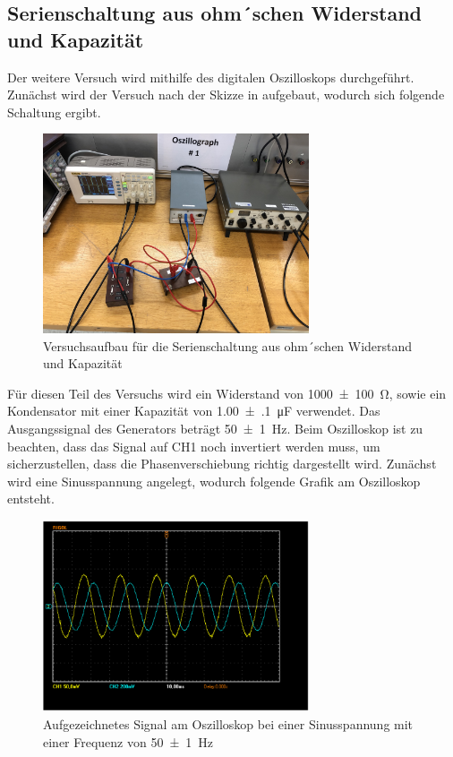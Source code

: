 \documentclass[11pt,ngerman]{scrartcl}
\begin{document}
\newpage

\subsection{Serienschaltung aus ohm´schen Widerstand und Kapazität}

Der weitere Versuch wird mithilfe des digitalen Oszilloskops durchgeführt. Zunächst wird der Versuch nach der Skizze in 	\label{fig:abb5} aufgebaut, wodurch sich folgende Schaltung ergibt.

\begin{figure}[H]
	\begin{center}
		\includegraphics[width=0.7\textwidth]{aufbau_c}
	\end{center}
	\caption{Versuchsaufbau für die Serienschaltung aus ohm´schen Widerstand und Kapazität}
	\label{fig:aufbau_c}
\end{figure}

Für diesen Teil des Versuchs wird ein Widerstand von \SI{1000(100)}{\ohm}, sowie ein Kondensator mit einer Kapazität von \SI{1.00(10)}{\micro\farad}	 verwendet. Das Ausgangssignal des Generators beträgt \SI{50(1)}{\hertz}. Beim Oszilloskop ist zu beachten, dass das Signal auf CH1 noch invertiert werden muss, um sicherzustellen, dass die Phasenverschiebung richtig dargestellt wird. Zunächst wird eine Sinusspannung angelegt, wodurch folgende Grafik am Oszilloskop entsteht.

\begin{figure}[H]
	\begin{center}
		\includegraphics[width=0.7\textwidth]{Bild_versuch1}
	\end{center}
	\caption{Aufgezeichnetes Signal am Oszilloskop bei einer Sinusspannung mit einer Frequenz von \SI{50(1)}{\hertz}}
	\label{fig:sinusschw}
\end{figure}
\end{document}
